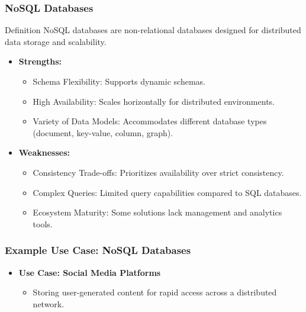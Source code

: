 \documentclass[aspectratio=169]{beamer}
\begin{document}
\begin{frame}[fragile]
    \frametitle{NoSQL Databases}
    \begin{block}{Definition}
        NoSQL databases are non-relational databases designed for distributed data storage and scalability.
    \end{block}
    \begin{itemize}
        \item \textbf{Strengths:}
            \begin{itemize}
                \item Schema Flexibility: Supports dynamic schemas.
                \item High Availability: Scales horizontally for distributed environments.
                \item Variety of Data Models: Accommodates different database types (document, key-value, column, graph).
            \end{itemize}
        \item \textbf{Weaknesses:}
            \begin{itemize}
                \item Consistency Trade-offs: Prioritizes availability over strict consistency.
                \item Complex Queries: Limited query capabilities compared to SQL databases.
                \item Ecosystem Maturity: Some solutions lack management and analytics tools.
            \end{itemize}
    \end{itemize}
\end{frame}

\begin{frame}[fragile]
    \frametitle{Example Use Case: NoSQL Databases}
    \begin{itemize}
        \item \textbf{Use Case: Social Media Platforms}
            \begin{itemize}
                \item Storing user-generated content for rapid access across a distributed network.
            \end{itemize}
    \end{itemize}
\end{frame}
\end{document}

